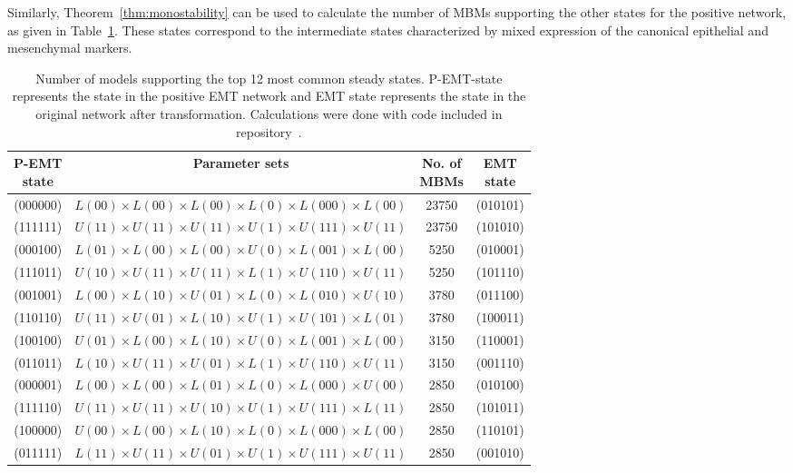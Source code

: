 \documentclass[10pt,letterpaper]{article}
\begin{document}
Similarly, Theorem~\ref{thm:monostability} can be used to calculate the number of MBMs supporting the other states for the positive network, as given in Table~\ref{tableEMT}. These states correspond to the intermediate states characterized by mixed expression of the canonical epithelial and mesenchymal markers.


\begin{table}[t]
    \centering
    \begin{tabular}{|c|c|c|c|}
    \hline 
    \makecell{P-EMT \\state} & Parameter sets & \makecell{No. of \\MBMs} & \makecell{EMT \\state} \\
    \hline
    (000000) & $L(00) \times L(00) \times L(00) \times L(0) \times L(000) \times L(00)$ & 23750 & (010101) \\
    (111111) & $U(11) \times U(11) \times U(11) \times U(1) \times U(111) \times U(11)$ & 23750 & (101010) \\
    (000100) & $L(01) \times L(00) \times L(00) \times U(0) \times L(001) \times L(00)$ & 5250 & (010001) \\
    (111011) & $U(10) \times U(11) \times U(11) \times L(1) \times U(110) \times U(11)$ & 5250 & (101110) \\
    (001001) & $L(00) \times L(10) \times U(01) \times L(0) \times L(010) \times U(10)$ & 3780 & (011100) \\
    (110110) & $U(11) \times U(01) \times L(10) \times U(1) \times U(101) \times L(01)$ & 3780 & (100011) \\
    (100100) & $U(01) \times L(00) \times L(10) \times U(0) \times L(001) \times L(00)$ & 3150 & (110001) \\
    (011011) & $L(10) \times U(11) \times U(01) \times L(1) \times U(110) \times U(11)$ & 3150 & (001110) \\
    (000001) & $L(00) \times L(00) \times L(01) \times L(0) \times L(000) \times U(00)$ & 2850 & (010100) \\
    (111110) & $U(11) \times U(11) \times U(10) \times U(1) \times U(111) \times L(11)$ & 2850 & (101011) \\
    (100000) & $U(00) \times L(00) \times L(10) \times L(0) \times L(000) \times L(00)$ & 2850 & (110101) \\
    (011111) & $L(11) \times U(11) \times U(01) \times U(1) \times U(111) \times U(11)$ & 2850 & (001010) \\
    \hline
    \end{tabular}
    \caption{Number of models supporting the top 12 most common steady states. P-EMT-state represents the state in the positive EMT network and EMT state represents the state in the original network after transformation. Calculations were done with code included in repository~\cite{adigwe_2026_18682834}.}
    \label{tableEMT}
\end{table}
\end{document}
